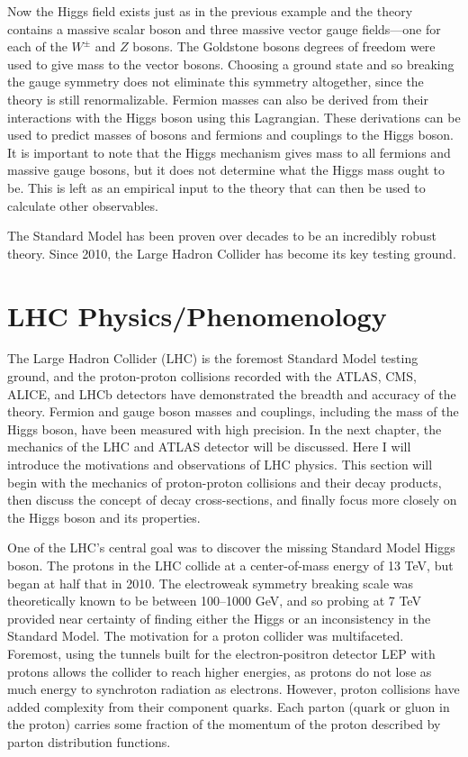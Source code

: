 Now the Higgs field exists just as in the previous example and the theory contains a massive scalar boson and three massive vector gauge fields---one for each of the $W^\pm$ and $Z$ bosons. The Goldstone bosons degrees of freedom were used to give mass to the vector bosons. Choosing a ground state and so breaking the gauge symmetry does not eliminate this symmetry altogether, since the theory is still renormalizable. Fermion masses can also be derived from their interactions with the Higgs boson using this Lagrangian. These derivations can be used to predict masses of bosons and fermions and couplings to the Higgs boson. It is important to note that the Higgs mechanism gives mass to all fermions and massive gauge bosons, but it does not determine what the Higgs mass ought to be. This is left as an empirical input to the theory that can then be used to calculate other observables. 

The Standard Model has been proven over decades to be an incredibly robust theory. Since 2010, the Large Hadron Collider has become its key testing ground. 

\section{LHC Physics/Phenomenology}
The Large Hadron Collider (LHC) is the foremost Standard Model testing ground, and the proton-proton collisions recorded with the ATLAS, CMS, ALICE, and LHCb detectors have demonstrated the breadth and accuracy of the theory. Fermion and gauge boson masses and couplings, including the mass of the Higgs boson, have been measured with high precision. In the next chapter, the mechanics of the LHC and ATLAS detector will be discussed. Here I will introduce the motivations and observations of LHC physics. This section will begin with the mechanics of proton-proton collisions and their decay products, then discuss the concept of decay cross-sections, and finally focus more closely on the Higgs boson and its properties.

One of the LHC's central goal was to discover the missing Standard Model Higgs boson. The protons in the LHC collide at a center-of-mass energy of 13 TeV, but began at half that in 2010. The electroweak symmetry breaking scale was theoretically known to be between 100--1000 GeV, and so probing at 7 TeV provided near certainty of finding either the Higgs or an inconsistency in the Standard Model. The motivation for a proton collider was multifaceted. Foremost, using the tunnels built for the electron-positron detector LEP with protons allows the collider to reach higher energies, as protons do not lose as much energy to synchroton radiation as electrons. However, proton collisions have added complexity from their component quarks. Each parton (quark or gluon in the proton) carries some fraction of the momentum of the proton described by parton distribution functions. 


